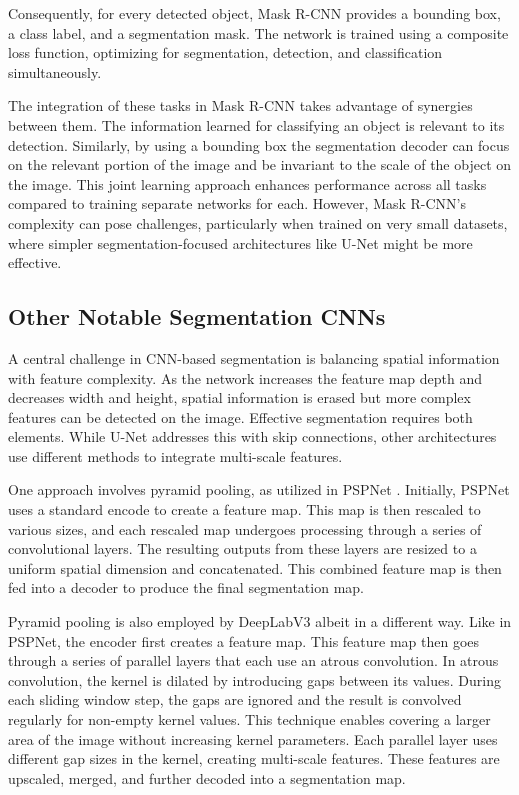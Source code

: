 Consequently, for every detected object, Mask R-CNN provides a bounding box, a class label, and a segmentation mask. The network is trained using a composite loss function, optimizing for segmentation, detection, and classification simultaneously.

The integration of these tasks in Mask R-CNN takes advantage of synergies between them. The information learned for classifying an object is relevant to its detection. Similarly, by using a bounding box the segmentation decoder can focus on the relevant portion of the image and be invariant to the scale of the object on the image. This joint learning approach enhances performance across all tasks compared to training separate networks for each. However, Mask R-CNN's complexity can pose challenges, particularly when trained on very small datasets, where simpler segmentation-focused architectures like U-Net might be more effective.

\subsection{Other Notable Segmentation CNNs}

A central challenge in CNN-based segmentation is balancing spatial information with feature complexity. As the network increases the feature map depth and decreases width and height, spatial information is erased but more complex features can be detected on the image. Effective segmentation requires both elements. While U-Net addresses this with skip connections, other architectures use different methods to integrate multi-scale features.

One approach involves pyramid pooling, as utilized in PSPNet \cite{zhao2017pspnet}. Initially, PSPNet uses a standard encode to create a feature map. This map is then rescaled to various sizes, and each rescaled map undergoes processing through a series of convolutional layers. The resulting outputs from these layers are resized to a uniform spatial dimension and concatenated. This combined feature map is then fed into a decoder to produce the final segmentation map.

Pyramid pooling is also employed by DeepLabV3 \cite{chen2017rethinking} albeit in a different way. Like in PSPNet, the encoder first creates a feature map. This feature map then goes through a series of parallel layers that each use an atrous convolution. In atrous convolution, the kernel is dilated by introducing gaps between its values. During each sliding window step, the gaps are ignored and the result is convolved regularly for non-empty kernel values. This technique enables covering a larger area of the image without increasing kernel parameters. Each parallel layer uses different gap sizes in the kernel, creating multi-scale features. These features are upscaled, merged, and further decoded into a segmentation map.

